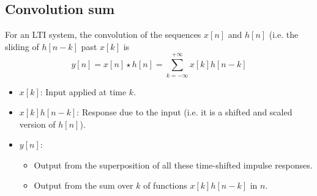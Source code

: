 \subsection{Convolution sum}
\begin{definition}
    For an LTI system, the convolution of the sequences $x[n]$ and $h[n]$ (i.e. the sliding of $h[n-k]$ past $x[k]$ is
    \begin{equation}
        y[n] = x[n] \star h[n] = \sum_{k=-\infty}^{+\infty} x[k] h[n-k]
    \end{equation}
    \begin{itemize}
        \item $x[k]$: Input applied at time $k$.
        \item $x[k]h[n-k]$: Response due to the input (i.e. it is a shifted and scaled version of $h[n]$).
        \item $y[n]$: 
        \begin{itemize}
            \item Output from the superposition of all these time-shifted impulse responses.
            \item Output from the sum over $k$ of functions $x[k]h[n-k]$ in $n$.
        \end{itemize}
    \end{itemize}
\end{definition}